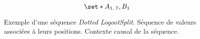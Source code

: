 \begin{figure}[tb]
\centering
\begin{subfigure}[b]{0.69\linewidth}
    \centering
    \caption{}\label{fig:dottedlogootsplit-1}
\end{subfigure}
\begin{subfigure}[b]{0.29\linewidth}
    \centering
    \begin{equation*}
        \set*{A_{\irange{1}{7}},B_1}
    \end{equation*}
    \caption{}\label{fig:dottedlogootsplit-2}
\end{subfigure}
\caption[Exemple d'une séquence \emph{Dotted LogootSplit}]{Exemple d'une séquence \emph{Dotted LogootSplit}.
 Séquence de valeurs associées à leurs positions.
 Contexte causal de la séquence.}\label{fig:dottedlogootsplit}
\end{figure}

